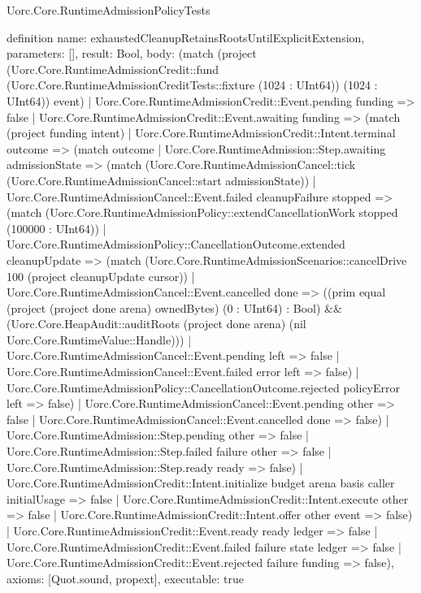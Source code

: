 \begin{lexlean}{Uorc.Core.RuntimeAdmissionPolicyTests}
\begin{semanticmodule}
definition{
  name: exhaustedCleanupRetainsRootsUntilExplicitExtension,
  parameters: [],
  result: Bool,
  body: (match (project (Uorc.Core.RuntimeAdmissionCredit::fund (Uorc.Core.RuntimeAdmissionCreditTests::fixture (1024 : UInt64)) (1024 : UInt64)) event)
    | Uorc.Core.RuntimeAdmissionCredit::Event.pending funding => false
    | Uorc.Core.RuntimeAdmissionCredit::Event.awaiting funding => (match (project funding intent)
      | Uorc.Core.RuntimeAdmissionCredit::Intent.terminal outcome => (match outcome
        | Uorc.Core.RuntimeAdmission::Step.awaiting admissionState => (match (Uorc.Core.RuntimeAdmissionCancel::tick (Uorc.Core.RuntimeAdmissionCancel::start admissionState))
          | Uorc.Core.RuntimeAdmissionCancel::Event.failed cleanupFailure stopped => (match (Uorc.Core.RuntimeAdmissionPolicy::extendCancellationWork stopped (100000 : UInt64))
            | Uorc.Core.RuntimeAdmissionPolicy::CancellationOutcome.extended cleanupUpdate => (match (Uorc.Core.RuntimeAdmissionScenarios::cancelDrive 100 (project cleanupUpdate cursor))
              | Uorc.Core.RuntimeAdmissionCancel::Event.cancelled done => ((prim equal (project (project done arena) ownedBytes) (0 : UInt64) : Bool) && (Uorc.Core.HeapAudit::auditRoots (project done arena) (nil Uorc.Core.RuntimeValue::Handle)))
              | Uorc.Core.RuntimeAdmissionCancel::Event.pending left => false
              | Uorc.Core.RuntimeAdmissionCancel::Event.failed error left => false)
            | Uorc.Core.RuntimeAdmissionPolicy::CancellationOutcome.rejected policyError left => false)
          | Uorc.Core.RuntimeAdmissionCancel::Event.pending other => false
          | Uorc.Core.RuntimeAdmissionCancel::Event.cancelled done => false)
        | Uorc.Core.RuntimeAdmission::Step.pending other => false
        | Uorc.Core.RuntimeAdmission::Step.failed failure other => false
        | Uorc.Core.RuntimeAdmission::Step.ready ready => false)
      | Uorc.Core.RuntimeAdmissionCredit::Intent.initialize budget arena basis caller initialUsage => false
      | Uorc.Core.RuntimeAdmissionCredit::Intent.execute other => false
      | Uorc.Core.RuntimeAdmissionCredit::Intent.offer other event => false)
    | Uorc.Core.RuntimeAdmissionCredit::Event.ready ready ledger => false
    | Uorc.Core.RuntimeAdmissionCredit::Event.failed failure state ledger => false
    | Uorc.Core.RuntimeAdmissionCredit::Event.rejected failure funding => false),
  axioms: [Quot.sound, propext],
  executable: true
}


\end{semanticmodule}
\end{lexlean}
